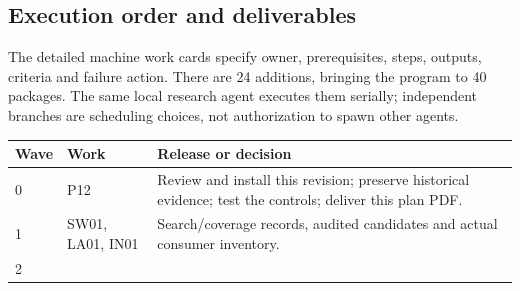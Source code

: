 \documentclass[
  11pt,
  a4paper,
]{article}
\begin{document}
\hypertarget{execution-order-and-deliverables}{%
\subsection{Execution order and
deliverables}\label{execution-order-and-deliverables}}

The detailed machine work cards specify owner, prerequisites, steps,
outputs, criteria and failure action. There are 24 additions, bringing
the program to 40 packages. The same local research agent executes them
serially; independent branches are scheduling choices, not authorization
to spawn other agents.

\begin{longtable}[]{@{}lll@{}}
\toprule
\begin{minipage}[b]{0.30\columnwidth}\raggedright
Wave\strut
\end{minipage} & \begin{minipage}[b]{0.30\columnwidth}\raggedright
Work\strut
\end{minipage} & \begin{minipage}[b]{0.30\columnwidth}\raggedright
Release or decision\strut
\end{minipage}\tabularnewline
\midrule
\endhead
\begin{minipage}[t]{0.30\columnwidth}\raggedright
0\strut
\end{minipage} & \begin{minipage}[t]{0.30\columnwidth}\raggedright
P12\strut
\end{minipage} & \begin{minipage}[t]{0.30\columnwidth}\raggedright
Review and install this revision; preserve historical evidence; test the
controls; deliver this plan PDF.\strut
\end{minipage}\tabularnewline
\begin{minipage}[t]{0.30\columnwidth}\raggedright
1\strut
\end{minipage} & \begin{minipage}[t]{0.30\columnwidth}\raggedright
SW01, LA01, IN01\strut
\end{minipage} & \begin{minipage}[t]{0.30\columnwidth}\raggedright
Search/coverage records, audited candidates and actual consumer
inventory.\strut
\end{minipage}\tabularnewline
\begin{minipage}[t]{0.30\columnwidth}\raggedright
2\strut
\end{minipage} & \begin{minipage}[t]{0.30\columnwidth}\raggedright

\end{minipage}
\end{longtable}
\end{document}
